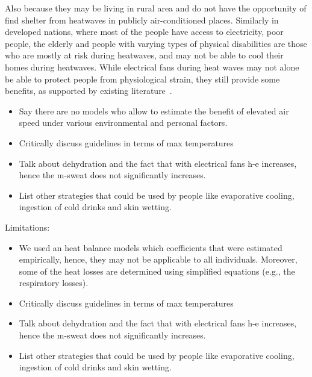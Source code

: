 Also because they may be living in rural area and do not have the opportunity of find shelter from heatwaves in publicly air-conditioned places.
Similarly in developed nations, where most of the people have access to electricity, poor people, the elderly and people with varying types of physical disabilities are those who are mostly at risk during heatwaves, and may not be able to cool their homes during heatwaves.
While electrical fans during heat waves may not alone be able to protect people from physiological strain, they still provide some benefits, as supported by existing literature~\cite{Jay2015, Jay2019a}.

\begin{itemize}
    \item Say there are no models who allow to estimate the benefit of elevated air speed under various environmental and personal factors.
    \item Critically discuss guidelines in terms of max temperatures
    \item Talk about dehydration and the fact that with electrical fans \ac{h-e} increases, hence the \ac{m-sweat} does not significantly increases. %
    \item List other strategies that could be used by people like evaporative cooling, ingestion of cold drinks and skin wetting.
\end{itemize}

Limitations:
\begin{itemize}
    \item We used an heat balance models which coefficients that were estimated empirically, hence, they may not be applicable to all individuals.
    Moreover, some of the heat losses are determined using simplified equations (e.g., the respiratory losses).

    \item Critically discuss guidelines in terms of max temperatures
    \item Talk about dehydration and the fact that with electrical fans \ac{h-e} increases, hence the \ac{m-sweat} does not significantly increases. %
    \item List other strategies that could be used by people like evaporative cooling, ingestion of cold drinks and skin wetting.
\end{itemize}
